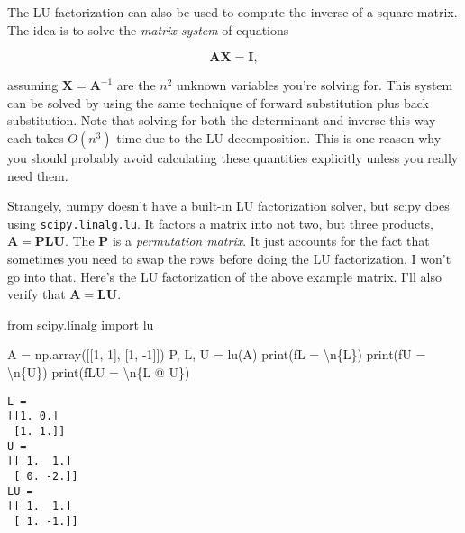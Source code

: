\documentclass[
  letterpaper,
  DIV=11,
  numbers=noendperiod]{scrreprt}
\newenvironment{Shaded}{\begin{snugshade}}{\end{snugshade}}
\newcommand{\BuiltInTok}[1]{\textcolor[rgb]{0.00,0.23,0.31}{#1}}
\newcommand{\CharTok}[1]{\textcolor[rgb]{0.13,0.47,0.30}{#1}}
\newcommand{\DecValTok}[1]{\textcolor[rgb]{0.68,0.00,0.00}{#1}}
\newcommand{\ImportTok}[1]{\textcolor[rgb]{0.00,0.46,0.62}{#1}}
\newcommand{\NormalTok}[1]{\textcolor[rgb]{0.00,0.23,0.31}{#1}}
\newcommand{\OperatorTok}[1]{\textcolor[rgb]{0.37,0.37,0.37}{#1}}
\newcommand{\SpecialCharTok}[1]{\textcolor[rgb]{0.37,0.37,0.37}{#1}}
\newcommand{\SpecialStringTok}[1]{\textcolor[rgb]{0.13,0.47,0.30}{#1}}
\begin{document}
The LU factorization can also be used to compute the inverse of a square
matrix. The idea is to solve the \emph{matrix system} of equations

\[\mathbf{A} \mathbf{X} = \mathbf{I},\]

assuming \(\mathbf{X}=\mathbf{A}^{-1}\) are the \(n^2\) unknown
variables you're solving for. This system can be solved by using the
same technique of forward substitution plus back substitution. Note that
solving for both the determinant and inverse this way each takes
\(O(n^3)\) time due to the LU decomposition. This is one reason why you
should probably avoid calculating these quantities explicitly unless you
really need them.

Strangely, numpy doesn't have a built-in LU factorization solver, but
scipy does using \texttt{scipy.linalg.lu}. It factors a matrix into not
two, but three products, \(\mathbf{A}=\mathbf{PLU}\). The \(\mathbf{P}\)
is a \emph{permutation matrix}. It just accounts for the fact that
sometimes you need to swap the rows before doing the LU factorization. I
won't go into that. Here's the LU factorization of the above example
matrix. I'll also verify that \(\mathbf{A}=\mathbf{LU}\).

\begin{Shaded}
\begin{Highlighting}[]
\ImportTok{from}\NormalTok{ scipy.linalg }\ImportTok{import}\NormalTok{ lu}

\NormalTok{A }\OperatorTok{=}\NormalTok{ np.array([[}\DecValTok{1}\NormalTok{, }\DecValTok{1}\NormalTok{], }
\NormalTok{              [}\DecValTok{1}\NormalTok{, }\OperatorTok{{-}}\DecValTok{1}\NormalTok{]])}
\NormalTok{P, L, U }\OperatorTok{=}\NormalTok{ lu(A)}
\BuiltInTok{print}\NormalTok{(}\SpecialStringTok{f\textquotesingle{}L = }\CharTok{\textbackslash{}n}\SpecialCharTok{\{}\NormalTok{L}\SpecialCharTok{\}}\SpecialStringTok{\textquotesingle{}}\NormalTok{)}
\BuiltInTok{print}\NormalTok{(}\SpecialStringTok{f\textquotesingle{}U = }\CharTok{\textbackslash{}n}\SpecialCharTok{\{}\NormalTok{U}\SpecialCharTok{\}}\SpecialStringTok{\textquotesingle{}}\NormalTok{)}
\BuiltInTok{print}\NormalTok{(}\SpecialStringTok{f\textquotesingle{}LU = }\CharTok{\textbackslash{}n}\SpecialCharTok{\{}\NormalTok{L }\OperatorTok{@}\NormalTok{ U}\SpecialCharTok{\}}\SpecialStringTok{\textquotesingle{}}\NormalTok{)}
\end{Highlighting}
\end{Shaded}

\begin{verbatim}
L = 
[[1. 0.]
 [1. 1.]]
U = 
[[ 1.  1.]
 [ 0. -2.]]
LU = 
[[ 1.  1.]
 [ 1. -1.]]
\end{verbatim}
\end{document}
